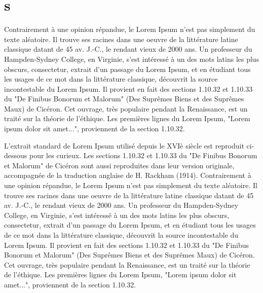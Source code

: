 \documentclass{book}
\begin{document}
\chapter{s}

\beginnumbering
\pstart





Contrairement à une opinion répandue, le Lorem Ipsum n'est pas simplement du texte aléatoire. Il trouve ses racines dans une oeuvre de la littérature latine classique datant de 45 av. J.-C., le rendant vieux de 2000 ans.  Un professeur du Hampden-Sydney College, en Virginie, s'est intéressé à un des mots latins les plus obscurs, consectetur, extrait d'un passage du Lorem Ipsum, et en étudiant tous les usages de ce mot dans la littérature classique, découvrit la source incontestable du Lorem Ipsum. Il provient en fait des sections 1.10.32 et 1.10.33 du "De Finibus Bonorum et Malorum" (Des Suprêmes Biens et des Suprêmes Maux) de Cicéron. Cet ouvrage, très populaire pendant la Renaissance, est un traité sur la théorie de l'éthique. Les premières lignes du Lorem Ipsum, "Lorem ipsum dolor sit amet...", proviennent de la section 1.10.32.

\beforeledchapter
{}

L'extrait standard de Lorem Ipsum utilisé depuis le XVIè siècle est reproduit ci-dessous pour les curieux. Les sections 1.10.32 et 1.10.33 du "De Finibus Bonorum et Malorum" de Cicéron sont aussi reproduites dans leur version originale, accompagnée de la traduction anglaise de H. Rackham (1914).
Contrairement à une opinion répandue, le Lorem Ipsum n'est pas simplement du texte aléatoire. Il trouve ses racines dans une oeuvre de la littérature latine classique datant de 45 av. J.-C., le rendant vieux de 2000 ans. Un professeur du Hampden-Sydney College, en Virginie, s'est intéressé à un des mots latins les plus obscurs, consectetur, extrait d'un passage du Lorem Ipsum, et en étudiant tous les usages de ce mot dans la littérature classique, découvrit la source incontestable du Lorem Ipsum. Il provient en fait des sections 1.10.32 et 1.10.33 du "De Finibus Bonorum et Malorum" (Des Suprêmes Biens et des Suprêmes Maux) de Cicéron. Cet ouvrage, très populaire pendant la Renaissance, est un traité sur la théorie de l'éthique. Les premières lignes du Lorem Ipsum, "Lorem ipsum dolor sit amet...", proviennent de la section 1.10.32.
\end{document}

